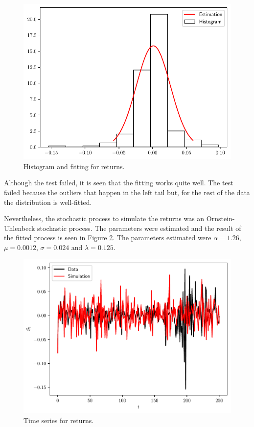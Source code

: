 \documentclass[11pt]{article}
\theoremstyle{definition}
\theoremstyle{remark}
\theoremstyle{remark}
\begin{document}
\begin{figure}[ht]
  \centering
  \includegraphics[scale=.5]{../plts/return_fitting}
  \caption{Histogram and fitting for returns.}
  \label{fig:rth}
\end{figure}

Although the test failed, it is seen that the fitting works quite well. The test
failed because the outliers that happen in the left tail but, for the rest of
the data the distribution is well-fitted.

Nevertheless, the stochastic process to simulate the returns was an
Ornstein-Uhlenbeck stochastic process. The parameters were estimated and the
result of the fitted process is seen in Figure \ref{fig:rtts}. The parameters
estimated were $\alpha = 1.26$, $\mu = 0.0012$, $\sigma = 0.024$ and
$\lambda=0.125$.

\begin{figure}[ht]
  \centering
  \includegraphics[scale=.5]{../plts/ou}
  \caption{Time series for returns.}
  \label{fig:rtts}
\end{figure}
\end{document}
